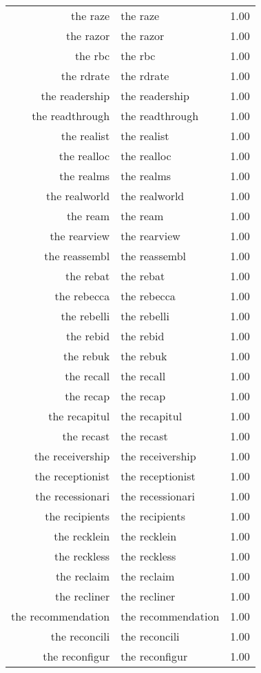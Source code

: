 \begin{table}[ht]
\begin{tabular}{rlr}
  the raze & the raze & 1.00 \\ 
  the razor & the razor & 1.00 \\ 
  the rbc & the rbc & 1.00 \\ 
  the rdrate & the rdrate & 1.00 \\ 
  the readership & the readership & 1.00 \\ 
  the readthrough & the readthrough & 1.00 \\ 
  the realist & the realist & 1.00 \\ 
  the realloc & the realloc & 1.00 \\ 
  the realms & the realms & 1.00 \\ 
  the realworld & the realworld & 1.00 \\ 
  the ream & the ream & 1.00 \\ 
  the rearview & the rearview & 1.00 \\ 
  the reassembl & the reassembl & 1.00 \\ 
  the rebat & the rebat & 1.00 \\ 
  the rebecca & the rebecca & 1.00 \\ 
  the rebelli & the rebelli & 1.00 \\ 
  the rebid & the rebid & 1.00 \\ 
  the rebuk & the rebuk & 1.00 \\ 
  the recall & the recall & 1.00 \\ 
  the recap & the recap & 1.00 \\ 
  the recapitul & the recapitul & 1.00 \\ 
  the recast & the recast & 1.00 \\ 
  the receivership & the receivership & 1.00 \\ 
  the receptionist & the receptionist & 1.00 \\ 
  the recessionari & the recessionari & 1.00 \\ 
  the recipients & the recipients & 1.00 \\ 
  the recklein & the recklein & 1.00 \\ 
  the reckless & the reckless & 1.00 \\ 
  the reclaim & the reclaim & 1.00 \\ 
  the recliner & the recliner & 1.00 \\ 
  the recommendation & the recommendation & 1.00 \\ 
  the reconcili & the reconcili & 1.00 \\ 
  the reconfigur & the reconfigur & 1.00 \\ 

\end{tabular}
\end{table}
